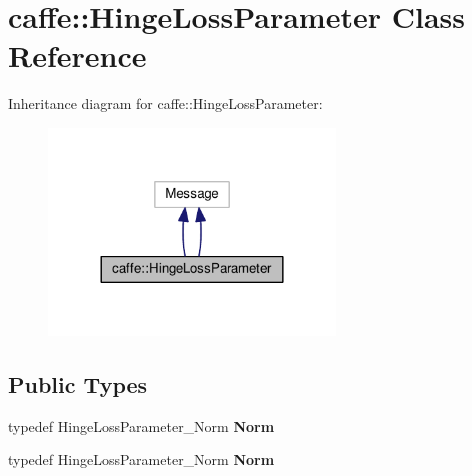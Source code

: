 \hypertarget{classcaffe_1_1_hinge_loss_parameter}{}\section{caffe\+:\+:Hinge\+Loss\+Parameter Class Reference}
\label{classcaffe_1_1_hinge_loss_parameter}


Inheritance diagram for caffe\+:\+:Hinge\+Loss\+Parameter\+:
\nopagebreak
\begin{figure}[H]
\begin{center}
\leavevmode
\includegraphics[width=216pt]{classcaffe_1_1_hinge_loss_parameter__inherit__graph}
\end{center}
\end{figure}
\subsection*{Public Types}
\begin{DoxyCompactItemize}
\item 
\mbox{\label{classcaffe_1_1_hinge_loss_parameter_a39179fcb9994db6d4d1583abca766015}} 
typedef Hinge\+Loss\+Parameter\+\_\+\+Norm {\bfseries Norm}
\item 
\mbox{\label{classcaffe_1_1_hinge_loss_parameter_a39179fcb9994db6d4d1583abca766015}} 
typedef Hinge\+Loss\+Parameter\+\_\+\+Norm {\bfseries Norm}
\end{DoxyCompactItemize}
